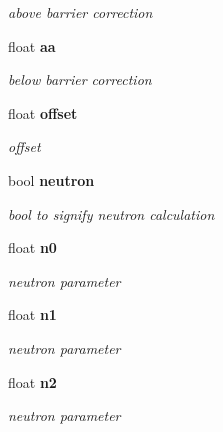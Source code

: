 \begin{CompactItemize}
\begin{CompactList}\small\item\em above barrier correction \item\end{CompactList}\item 
float \bf{aa}\label{classCSigCharged_aaba6b096eabd13e2b67d3280a3b5621}

\begin{CompactList}\small\item\em below barrier correction \item\end{CompactList}\item 
float \bf{offset}\label{classCSigCharged_eebf83c2154c3cf90e4d5bc542ebec5e}

\begin{CompactList}\small\item\em offset \item\end{CompactList}\item 
bool \bf{neutron}\label{classCSigCharged_ddd3529b64f4785ebed1c1c836014040}

\begin{CompactList}\small\item\em bool to signify neutron calculation \item\end{CompactList}\item 
float \bf{n0}\label{classCSigCharged_d963202b2a1cbe5ed6b32c13633f04cb}

\begin{CompactList}\small\item\em neutron parameter \item\end{CompactList}\item 
float \bf{n1}\label{classCSigCharged_9195bf8cbeca8cd04cb40b9bb9bf2314}

\begin{CompactList}\small\item\em neutron parameter \item\end{CompactList}\item 
float \bf{n2}\label{classCSigCharged_15d00779ea82f9e4d5343faeb2d8d6d5}

\begin{CompactList}\small\item\em neutron parameter \item\end{CompactList}\end{CompactItemize}


